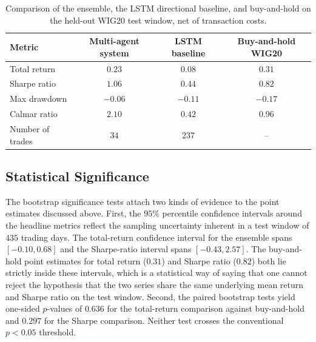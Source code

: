 \documentclass{ieeeaccess}
\newcommand{\TRtest}{\ensuremath{0.23}}
\newcommand{\TRtestCIlow}{\ensuremath{-0.10}}
\newcommand{\TRtestCIhigh}{\ensuremath{0.68}}
\newcommand{\Shtest}{\ensuremath{1.06}}
\newcommand{\ShtestCIlow}{\ensuremath{-0.43}}
\newcommand{\ShtestCIhigh}{\ensuremath{2.57}}
\newcommand{\MDDtest}{\ensuremath{-0.06}}
\newcommand{\Calmtest}{\ensuremath{2.10}}
\newcommand{\Ntrades}{\ensuremath{34}}
\newcommand{\BHtest}{\ensuremath{0.31}}
\newcommand{\BHsharpe}{\ensuremath{0.82}}
\newcommand{\MDDbh}{\ensuremath{-0.17}}
\newcommand{\Calmbh}{\ensuremath{0.96}}
\newcommand{\PvsBH}{\ensuremath{0.636}}
\newcommand{\PvsBHsharpe}{\ensuremath{0.297}}
\newcommand{\OOSDays}{\ensuremath{435}}
\newcommand{\LSTMtest}{\ensuremath{0.08}}
\newcommand{\LSTMsharpe}{\ensuremath{0.44}}
\newcommand{\LSTMmdd}{\ensuremath{-0.11}}
\newcommand{\LSTMcalmar}{\ensuremath{0.42}}
\newcommand{\LSTMtrades}{\ensuremath{237}}
\begin{document}
\begin{table}[t]
\centering
\caption{Comparison of the ensemble, the LSTM directional baseline, and buy-and-hold on the held-out WIG20 test window, net of transaction costs.}
\label{tab:lstm}
\begin{tabular}{lccc}
\toprule
Metric & Multi-agent system & LSTM baseline & Buy-and-hold WIG20 \\
\midrule
Total return     & $\TRtest$   & $\LSTMtest$   & $\BHtest$ \\
Sharpe ratio     & $\Shtest$   & $\LSTMsharpe$ & $\BHsharpe$ \\
Max drawdown     & $\MDDtest$  & $\LSTMmdd$    & $\MDDbh$ \\
Calmar ratio     & $\Calmtest$ & $\LSTMcalmar$ & $\Calmbh$ \\
Number of trades & $\Ntrades$  & $\LSTMtrades$ & -- \\
\bottomrule
\end{tabular}
\end{table}

\subsection{Statistical Significance}
\label{subsec:significance}

The bootstrap significance tests attach two kinds of evidence to the point estimates discussed above. First, the $95\%$ percentile confidence intervals around the headline metrics reflect the sampling uncertainty inherent in a test window of \OOSDays{} trading days. The total-return confidence interval for the ensemble spans $[\TRtestCIlow, \TRtestCIhigh]$ and the Sharpe-ratio interval spans $[\ShtestCIlow, \ShtestCIhigh]$. The buy-and-hold point estimates for total return (\BHtest{}) and Sharpe ratio (\BHsharpe{}) both lie strictly inside these intervals, which is a statistical way of saying that one cannot reject the hypothesis that the two series share the same underlying mean return and Sharpe ratio on the test window. Second, the paired bootstrap tests yield one-sided $p$-values of \PvsBH{} for the total-return comparison against buy-and-hold and \PvsBHsharpe{} for the Sharpe comparison. Neither test crosses the conventional $p < 0.05$ threshold.
\end{document}
